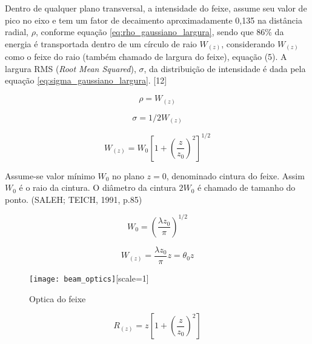 Dentro de qualquer plano transversal, a intensidade do feixe, assume seu valor de pico no eixo e tem um fator de decaimento aproximadamente 0,135 na distância radial, $\rho$, conforme equação \eqref{eq:rho_gaussiano_largura}, sendo que 86\% da energia é transportada dentro de um círculo de raio $W_{(z)}$, considerando $W_{(z)}$ como o feixe do raio (também chamado de largura do feixe), equação (5). A largura RMS (\emph{Root Mean Squared}), $\sigma$, da distribuição de intensidade é dada pela equação \eqref{eq:sigma_gaussiano_largura}. [12]

\begin{equation}
\label{eq:rho_gaussiano_largura}
\rho = W_{(z)}
\end{equation}

\begin{equation}
\label{eq:sigma_gaussiano_largura}
\sigma = 1/2W_{(z)}
\end{equation}

\begin{equation}
\label{eq:gaussiano_largura}
W_{(z)} = W_0 \left [ 1 + \left( \frac{z}{z_0} \right ) ^2 \right ] ^{1/2}
\end{equation}

Assume-se valor mínimo $W_0$ no plano $z = 0$, denominado cintura do feixe. Assim $W_0$ é o raio da cintura. O diâmetro da cintura $2W_0$ é chamado de tamanho do ponto. (SALEH; TEICH, 1991, p.85)

\begin{equation}
\label{eq:raio_cintura_1}
W_0 = \left( \frac{\lambda z_0}{\pi} \right)^{1/2}
\end{equation}

\begin{equation}
\label{eq:raio_cintura_2}
W_{(z)} = \frac{\lambda z_0}{\pi} z = \theta_0 z
\end{equation}

\begin{figure}[ht!]
	\centering
	\caption{Optica do feixe}
	\label{fig:beam_optics}
	\texttt{[image: beam\_optics]}[scale=1]
\end{figure}

\begin{equation}
\label{eq:raio_curvatura}
R_{(z)} = z \left [ 1 + \left( \frac{z}{z_0} \right ) ^2 \right ]
\end{equation}

